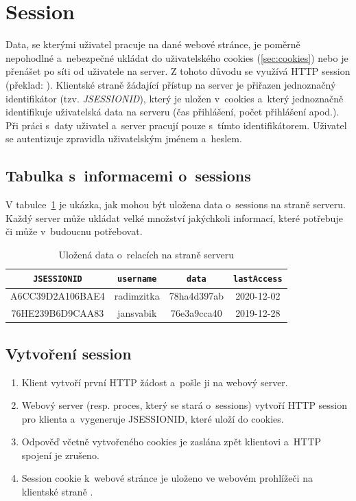 \section{Session}
\label{sec:session}
Data, se kterými uživatel pracuje na dané webové stránce, je poměrně nepohodlné a~nebezpečné ukládat do uživatelského cookies (\ref{sec:cookies}) nebo je přenášet po síti od uživatele na server. Z tohoto důvodu se využívá HTTP session (překlad: ). Klientské straně žádající přístup na server je přiřazen jednoznačný identifikátor (tzv. \textit{JSESSIONID}), který je uložen v~cookies a~který jednoznačně identifikuje uživatelská data na serveru (čas přihlášení, počet přihlášení apod.). Při práci s~daty uživatel a~server pracují pouze s~tímto identifikátorem. Uživatel se autentizuje zpravidla uživatelským jménem a~heslem.

\subsection*{Tabulka s~informacemi o~sessions}
V tabulce~\ref{tab:session_cookie} je ukázka, jak mohou být uložena data o~sessions na straně serveru. Každý server může ukládat velké množství jakýchkoli informací, které potřebuje či může v~budoucnu potřebovat.

\begin{table}[H]
\centering
\label{tab:session_cookie}
\begin{tabular}{|c|c|c|c|}
\hline
\texttt{JSESSIONID} & \texttt{username} & \texttt{data} & \texttt{lastAccess} \\ \hline
A6CC39D2A106BAE4 & radimzitka & 78ha4d397ab & 2020-12-02 \\ \hline
76HE239B6D9CAA83& jansvabik & 76e3a9cca40 & 2019-12-28 \\ \hline
\end{tabular}
\caption{Uložená data o~relacích na straně serveru}
\end{table}

\subsection*{Vytvoření session}
\begin{enumerate}
  \item Klient vytvoří první HTTP žádost a~pošle ji na webový server.
  \item Webový server (resp. proces, který se stará o~sessions) vytvoří HTTP session pro klienta a~vygeneruje JSESSIONID, které uloží do cookies.
  \item Odpověď včetně vytvořeného cookies je zaslána zpět klientovi a~HTTP spojení je zrušeno.
  \item Session cookie k~webové stránce je uloženo ve webovém prohlížeči na klientské straně \cite{bib:session_creating}.
\end{enumerate}

